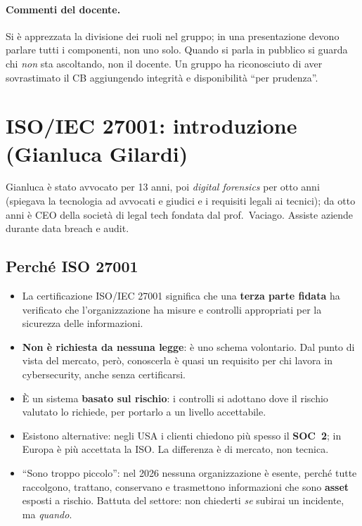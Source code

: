 \paragraph{Commenti del docente.} Si è apprezzata la divisione dei ruoli nel gruppo; in una
presentazione devono parlare tutti i componenti, non uno solo. Quando si parla in pubblico si guarda
chi \emph{non} sta ascoltando, non il docente. Un gruppo ha riconosciuto di aver sovrastimato il CB
aggiungendo integrità e disponibilità ``per prudenza''.

\section{ISO/IEC 27001: introduzione (Gianluca Gilardi)}

\begin{nota}[Il docente]
Gianluca è stato avvocato per 13 anni, poi \emph{digital forensics} per otto anni (spiegava la
tecnologia ad avvocati e giudici e i requisiti legali ai tecnici); da otto anni è CEO della società di
legal tech fondata dal prof.~Vaciago. Assiste aziende durante data breach e audit.
\end{nota}

\subsection{Perché ISO 27001}
\begin{itemize}
  \item La certificazione ISO/IEC 27001 significa che una \textbf{terza parte fidata} ha verificato
    che l'organizzazione ha misure e controlli appropriati per la sicurezza delle informazioni.
  \item \textbf{Non è richiesta da nessuna legge}: è uno schema volontario. Dal punto di vista del
    mercato, però, conoscerla è quasi un requisito per chi lavora in cybersecurity, anche senza
    certificarsi.
  \item È un sistema \textbf{basato sul rischio}: i controlli si adottano dove il rischio valutato lo
    richiede, per portarlo a un livello accettabile.
  \item Esistono alternative: negli USA i clienti chiedono più spesso il \textbf{SOC~2}; in Europa è
    più accettata la ISO. La differenza è di mercato, non tecnica.
  \item ``Sono troppo piccolo'': nel 2026 nessuna organizzazione è esente, perché tutte raccolgono,
    trattano, conservano e trasmettono informazioni che sono \textbf{asset} esposti a rischio.
    Battuta del settore: non chiederti \emph{se} subirai un incidente, ma \emph{quando}.
\end{itemize}

